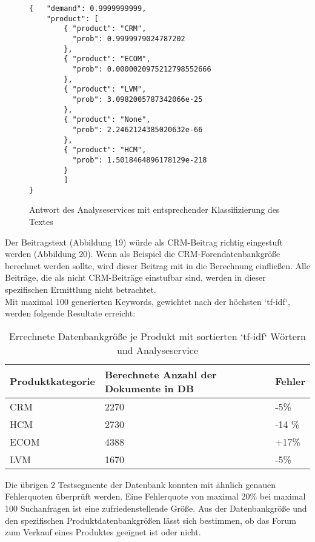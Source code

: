 \begin{figure}[h!]
\begin{lstlisting}[language=HTML5]
{   "demand": 0.9999999999,
    "product": [
        { "product": "CRM",
          "prob": 0.9999979024787202
        },
        { "product": "ECOM",
          "prob": 0.0000020975212798552666
        },
        { "product": "LVM",
          "prob": 3.0982005787342066e-25
        },
        { "product": "None",
          "prob": 2.2462124385020632e-66
        },
        { "product": "HCM",
          "prob": 1.5018464896178129e-218
        }
		]
}
\end{lstlisting}
\caption{Antwort des Analyseservices mit entsprechender Klassifizierung des Textes}
\end{figure}

Der Beitragstext (Abbildung 19) würde als CRM-Beitrag richtig eingestuft werden (Abbildung 20). Wenn als Beispiel die CRM-Forendatenbankgröße berechnet werden sollte, wird dieser Beitrag mit in die Berechnung einfließen. Alle Beiträge, die als nicht CRM-Beiträge einstufbar sind, werden in dieser spezifischen Ermittlung nicht betrachtet.\\
Mit maximal 100 generierten Keywords, gewichtet nach der höchsten `tf-idf`, werden folgende Resultate erreicht:

\begin{table}[h!]
\begin{tabular}{ | p{3cm} | l | l |}
\hline
\textbf{Produktkategorie} & \textbf{Berechnete Anzahl der Dokumente in DB} & \textbf{Fehler} \\ \hline
CRM & 2270 & -5\% \\ \hline
HCM & 2730 & -14 \% \\ \hline
ECOM & 4388 & +17\% \\ \hline
LVM & 1670 & -5\% \\ \hline
\end{tabular}
\caption{Errechnete Datenbankgröße je Produkt mit sortierten `tf-idf` Wörtern und Analyseservice}
\end{table}

Die übrigen 2 Testsegmente der Datenbank konnten mit ähnlich genauen Fehlerquoten überprüft werden.
Eine Fehlerquote von maximal 20\% bei maximal 100 Suchanfragen ist eine zufriedenstellende Größe. Aus der Datenbankgröße und den spezifischen Produktdatenbankgrößen lässt sich bestimmen, ob das Forum zum Verkauf eines Produktes geeignet ist oder nicht.
\newpage